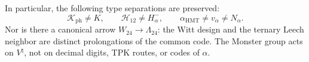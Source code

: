 In particular, the following type separations are preserved:
\[
 \mathcal K_{\mathrm{ph}}\neq K,\qquad
 \mathcal H_{12}\neq H^-_\alpha,\qquad
 \alpha_{\mathrm{HMT}}\neq v_\alpha\neq N_\alpha.
\]
Nor is there a canonical arrow \(W_{24}\to\Lambda_{24}\): the Witt design
and the ternary Leech neighbor are distinct prolongations of the common code.
The Monster group acts on \(V^\natural\), not on decimal digits, TPK routes,
or codes of \(\alpha\).
